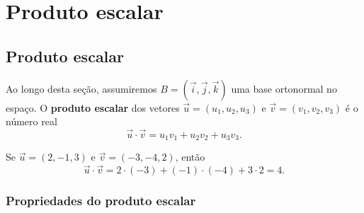 
\chapter{Produto escalar}\label{cap_prodesc}
\thispagestyle{fancy}

\section{Produto escalar}\label{cap_prodesc_sec_prodesc}

Ao longo desta seção, assumiremos $B = (\vec{i},\vec{j},\vec{k})$ uma base ortonormal no espaço. O {\bf produto escalar} dos vetores $\vec{u} = (u_1,u_2,u_3)$ e $\vec{v}=(v_1,v_2,v_3)$ é o número real
\begin{equation}\label{eq:prodesc_ortonormal}
  \vec{u}\cdot\vec{v} = u_1v_1+u_2v_2+u_3v_3.
\end{equation}

\begin{ex}
  Se $\vec{u}=(2,-1,3)$ e $\vec{v}=(-3,-4,2)$, então
  \begin{equation}
    \vec{u}\cdot\vec{v} = 2\cdot(-3)+(-1)\cdot(-4)+3\cdot 2 = 4.
  \end{equation}
\end{ex}

\subsection{Propriedades do produto escalar}

